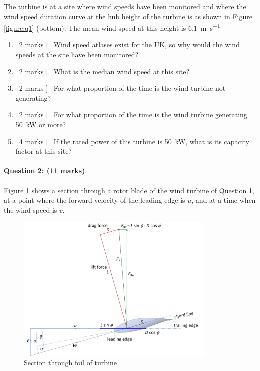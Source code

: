 \documentclass[a4paper,12pt,fleqn]{article}
\begin{document}
The turbine is at a site where wind speeds have been monitored and where the wind speed duration curve at the hub height of the turbine is as shown in 
Figure \ref{figure:q1} (bottom). 
The mean wind speed at this height is \SI{6.1}{\metre\per\second}

\begin{enumerate} [resume,label=\alph*)]
\item \lbrack\ 2 marks ] \ Wind speed atlases exist for the UK, so why would the wind speeds at the site have been monitored?
\item \lbrack\ 2 marks ] \ What is the median wind speed at this site?
\item \lbrack\ 2 marks ] \ For what proportion of the time is the wind turbine not generating?
\item \lbrack\ 2 marks ] \ For what proportion of the time is the wind turbine generating \SI{50}{\kilo\watt} or more?
\item \lbrack\ 4 marks ] \ If the rated power of this turbine is \SI{50}{\kilo\watt}, what is its capacity factor at this site?
\end{enumerate}

\paragraph{\textbf{Question 2: (11 marks)}}
Figure \ref{figure:q2} shows a section through a rotor blade of the wind turbine of Question 1, at a point where the forward velocity
 of the leading edge is $u$, and at a time when the wind speed is $v$.
\begin{figure}
\centering
\includegraphics[width=0.85\textwidth]{./figures/vectors}
\caption{Section through foil of turbine}
\label{figure:q2}
\end{figure}
\end{document}

